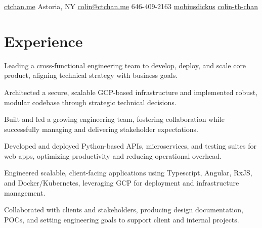 \documentclass[]{plushcv}
\begin{document}
%
%
{
  \contactline
  {\href{https://ctchan.me}{ctchan.me}}
  {Astoria, NY}
  {\href{mailto:colin@ctchan.me}{colin@ctchan.me}}
  {646-409-2163}
  {\href{https://www.github.com/mobiusdickus}{mobiusdickus}}
  {\href{https://www.linkedin.com/in/colin-th-chan/}{colin-th-chan}}
}

%
%

\begin{minipage}[t]{0.70\textwidth} 



\section{Experience}
\vspace{\topsep} %
\begin{tightemize}
\sectionsep
\item Leading a cross-functional engineering team to develop, deploy, and scale core product, aligning technical strategy with business goals.
\item Architected a secure, scalable GCP-based infrastructure and implemented robust, modular codebase through strategic technical decisions.
\item Built and led a growing engineering team, fostering collaboration while successfully managing and delivering stakeholder expectations.
\end{tightemize}
\sectionsep

\begin{tightemize}
\sectionsep
\item Developed and deployed Python-based APIs, microservices, and testing suites for web apps, optimizing productivity and reducing operational overhead.
\item Engineered scalable, client-facing applications using Typescript, Angular, RxJS, and Docker/Kubernetes, leveraging GCP for deployment and infrastructure management.
\item Collaborated with clients and stakeholders, producing design documentation, POCs, and setting engineering goals to support client and internal projects.
\end{tightemize}
\sectionsep


\end{minipage}
\end{document}

